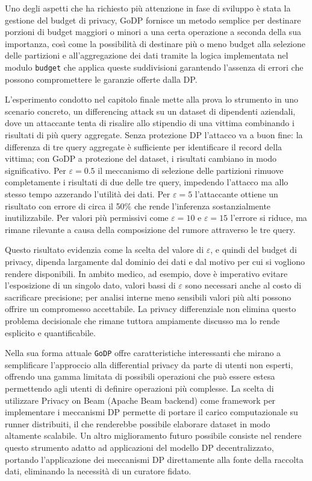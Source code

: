 Uno degli aspetti che ha richiesto più attenzione in fase di sviluppo è stata la gestione del budget di privacy, GoDP fornisce un metodo semplice per destinare porzioni di budget maggiori o minori a una certa operazione a seconda della sua importanza, così come la possibilità di destinare più o meno budget alla selezione delle partizioni e all'aggregazione dei dati tramite la logica implementata nel modulo \texttt{budget} che applica queste suddivisioni garantendo l'assenza di errori che possono compromettere le garanzie offerte dalla DP.

L'esperimento condotto nel capitolo finale mette alla prova lo strumento in uno scenario concreto, un differencing attack su un dataset di dipendenti aziendali, dove un attaccante tenta di risalire allo stipendio di una vittima combinando i risultati di più query aggregate. Senza protezione DP l'attacco va a buon fine: la differenza di tre query aggregate è sufficiente per identificare il record della vittima; con GoDP a protezione del dataset, i risultati cambiano in modo significativo. Per $\varepsilon = 0.5$ il meccanismo di selezione delle partizioni rimuove completamente i risultati di due delle tre query, impedendo l'attacco ma allo stesso tempo azzerando l'utilità dei dati. Per $\varepsilon = 5$ l'attaccante ottiene un risultato con errore di circa il 50\% che rende l'inferenza sostanzialmente inutilizzabile. Per valori più permissivi come $\varepsilon = 10$ e $\varepsilon = 15$ l'errore si riduce, ma rimane rilevante a causa della composizione del rumore attraverso le tre query.

Questo risultato evidenzia come la scelta del valore di $\varepsilon$, e quindi del budget di privacy, dipenda largamente dal dominio dei dati e dal motivo per cui si vogliono rendere disponibili. In ambito medico, ad esempio, dove è imperativo evitare l'esposizione di un singolo dato, valori bassi di $\varepsilon$ sono necessari anche al costo di sacrificare precisione; per analisi interne meno sensibili valori più alti possono offrire un compromesso accettabile. La privacy differenziale non elimina questo problema decisionale che rimane tuttora ampiamente discusso ma lo rende esplicito e quantificabile\cite{epsilonExamples}\cite{howMuchIsEnough}.

Nella sua forma attuale \texttt{GoDP} offre caratteristiche interessanti che mirano a semplificare l'approccio alla differential privacy da parte di utenti non esperti, offrendo una gamma limitata di possibili operazioni che può essere estesa permettendo agli utenti di definire operazioni più complesse. La scelta di utilizzare Privacy on Beam (Apache Beam backend) come framework per implementare i meccanismi DP permette di portare il carico computazionale su runner distribuiti, il che renderebbe possibile elaborare dataset in modo altamente scalabile. Un altro miglioramento futuro possibile consiste nel rendere questo strumento adatto ad applicazioni del modello DP decentralizzato, portando l'applicazione dei meccanismi DP direttamente alla fonte della raccolta dati, eliminando la necessità di un curatore fidato.